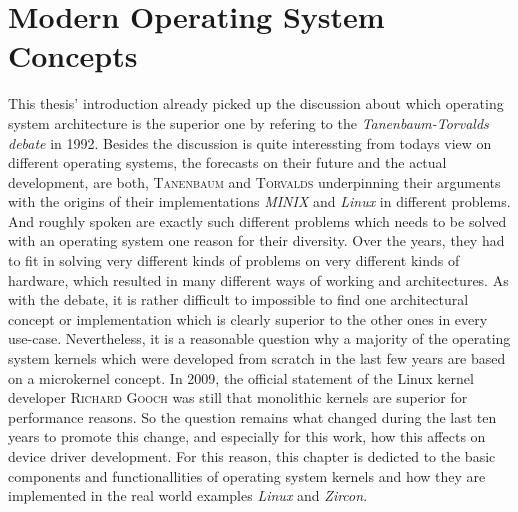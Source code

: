 
\chapter{Modern Operating System Concepts}\label{ch:modern-os-concepts}
%
%
This thesis' introduction already picked up the discussion about which operating system architecture is the superior one by refering to the \textit{Tanenbaum-Torvalds debate}\cite{linux-is-obsolete} in 1992.
Besides the discussion is quite interessting from todays view on different operating systems, the forecasts on their future and the actual development, are both, \textsc{Tanenbaum} and \textsc{Torvalds} underpinning their arguments with the origins of their implementations \textit{MINIX} and \textit{Linux} in different problems. 
And roughly spoken are exactly such different problems which needs to be solved with an operating system one reason for their diversity. 
Over the years, they had to fit in solving very different kinds of problems on very different kinds of hardware, which resulted in many different ways of working and architectures. 
As with the debate, it is rather difficult to impossible to find one architectural concept or implementation which is clearly superior to the other ones in every use-case. 
Nevertheless, it is a reasonable question why a majority of the operating system kernels which were developed from scratch in the last few years are based on a microkernel concept.
In 2009, the official statement of the Linux kernel developer \textsc{Richard Gooch} was still that monolithic kernels are superior for performance reasons\cite{why-linux-monolith}.
So the question remains what changed during the last ten years to promote this change, and especially for this work, how this affects on device driver development.
For this reason, this chapter is dedicted to the basic components and functionallities of operating system kernels and how they are implemented in the real world examples \textit{Linux} and \textit{Zircon}.


